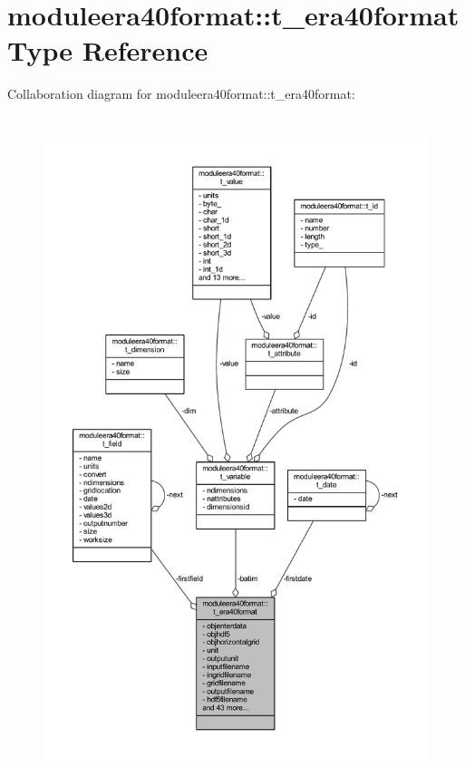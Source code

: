 \hypertarget{structmoduleera40format_1_1t__era40format}{}\section{moduleera40format\+:\+:t\+\_\+era40format Type Reference}
\label{structmoduleera40format_1_1t__era40format}


Collaboration diagram for moduleera40format\+:\+:t\+\_\+era40format\+:\nopagebreak
\begin{figure}[H]
\begin{center}
\leavevmode
\includegraphics[height=550pt]{structmoduleera40format_1_1t__era40format__coll__graph}
\end{center}
\end{figure}
